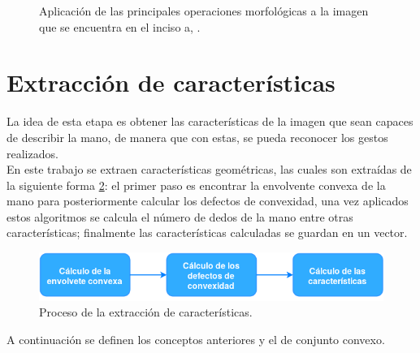 \begin{figure}[h!]
\caption{Aplicación de las principales operaciones morfológicas a la imagen que se encuentra en el inciso a, \citep{Smith1999}.\quad }\label{fig:OM}
\end{figure} 



\section{Extracción de características}\label{sec:Convexhull} 

La idea de esta etapa es obtener las características de la imagen que sean capaces de describir la mano, de manera que con estas, se pueda reconocer los gestos realizados.\\     
En este trabajo se extraen características geométricas, las cuales son extraídas de la siguiente forma \ref{fig:DiagramaExtraccionCaracteristicas}: el primer paso es encontrar la envolvente convexa de la mano para posteriormente calcular los defectos de convexidad, una vez aplicados estos algoritmos se calcula el número de dedos de la mano entre otras características; finalmente las características calculadas  se guardan en un vector.  

\begin{figure}[h!]
\begin{center}
\includegraphics[scale=.7]{./Figures/DExtraccion.png}
\end{center}
\caption{Proceso de la extracción de características.}
\label{fig:DiagramaExtraccionCaracteristicas}
\end{figure} 

A continuación se definen los conceptos anteriores y el de conjunto convexo.

